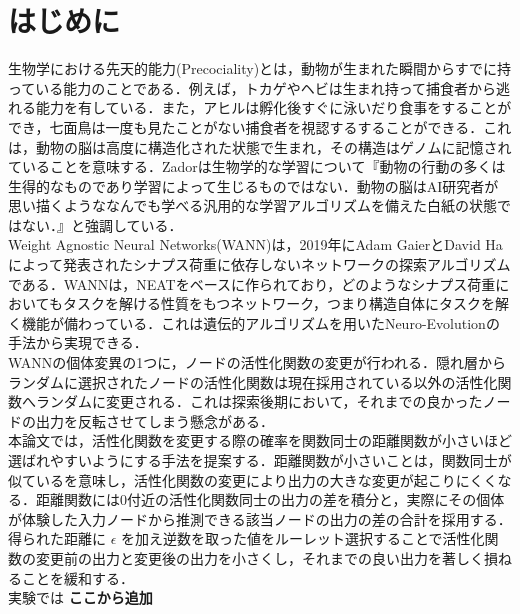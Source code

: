 \section{はじめに}
生物学における先天的能力(Precociality)とは，動物が生まれた瞬間からすでに持っている能力のことである．例えば，トカゲやヘビは生まれ持って捕食者から逃れる能力を有している．また，アヒルは孵化後すぐに泳いだり食事をすることができ，七面鳥は一度も見たことがない捕食者を視認するすることができる．これは，動物の脳は高度に構造化された状態で生まれ，その構造はゲノムに記憶されていることを意味する．Zadorは生物学的な学習について『動物の行動の多くは生得的なものであり学習によって生じるものではない．動物の脳はAI研究者が思い描くようななんでも学べる汎用的な学習アルゴリズムを備えた白紙の状態ではない．』と強調している\cite{先天的能力}．\\
Weight Agnostic Neural Networks(WANN)は，2019年にAdam GaierとDavid Haによって発表されたシナプス荷重に依存しないネットワークの探索アルゴリズムである\cite{WANN}．WANNは，NEAT\cite{NEAT}をベースに作られており，どのようなシナプス荷重においてもタスクを解ける性質をもつネットワーク，つまり構造自体にタスクを解く機能が備わっている．これは遺伝的アルゴリズム\cite{遺伝的アルゴリズム}を用いたNeuro-Evolution\cite{NE}の手法から実現できる．\\
WANNの個体変異の1つに，ノードの活性化関数の変更が行われる．隠れ層からランダムに選択されたノードの活性化関数は現在採用されている以外の活性化関数へランダムに変更される．これは探索後期において，それまでの良かったノードの出力を反転させてしまう懸念がある．\\
本論文では，活性化関数を変更する際の確率を関数同士の距離関数が小さいほど選ばれやすいようにする手法を提案する．距離関数が小さいことは，関数同士が似ているを意味し，活性化関数の変更により出力の大きな変更が起こりにくくなる．距離関数には0付近の活性化関数同士の出力の差を積分と，実際にその個体が体験した入力ノードから推測できる該当ノードの出力の差の合計を採用する．得られた距離に $ \epsilon $ を加え逆数を取った値をルーレット選択することで活性化関数の変更前の出力と変更後の出力を小さくし，それまでの良い出力を著しく損ねることを緩和する．\\
実験では \textbf{ここから追加}